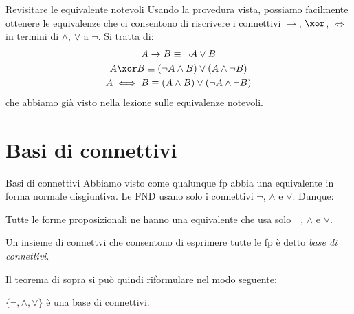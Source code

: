 \documentclass[aspectratio=169,10pt,dvipsnames,xcolor=table,handout]{beamer}
\begin{document}
\begin{frame}{Revisitare le equivalente notevoli}
    Usando la provedura vista, possiamo facilmente ottenere le equivalenze che ci consentono di riscrivere i connettivi $\to$, $\xor$, $\iff$  in termini di $\wedge$, $\vee$ a $\neg$. Si tratta di:
    \begin{gather*}
        A \to B \equiv \neg A \vee B \\
        A \xor B \equiv (\neg A \wedge B) \vee (A \wedge \neg B)\\
        A \iff B \equiv (A \wedge B) \vee (\neg A \wedge \neg B)
    \end{gather*}
    che abbiamo già visto nella lezione sulle equivalenze notevoli.
\end{frame}

\section{Basi di connettivi}

\begin{frame}{Basi di connettivi}
    Abbiamo visto come qualunque fp abbia una equivalente in forma normale disgiuntiva. Le FND usano solo i connettivi $\neg$, $\wedge$ e $\vee$. Dunque:
    \begin{theorem}
        Tutte le forme proposizionali ne hanno una equivalente che usa solo $\neg$, $\wedge$ e $\vee$.
    \end{theorem}

    \begin{definition}
        Un insieme di connettvi che consentono di esprimere tutte le fp è detto \emph{base di connettivi}.
    \end{definition}

    Il teorema di sopra si può quindi riformulare nel modo seguente:
    \begin{theorem}
        $\{ \neg, \wedge, \vee\}$ è una base di connettivi.
    \end{theorem}
\end{frame}
\end{document}
